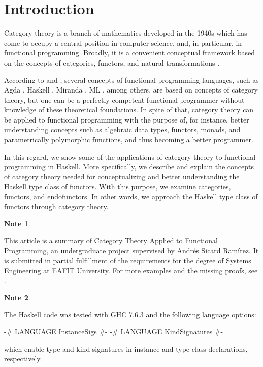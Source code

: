 \documentclass[11pt,letterpaper]{article}
\theoremstyle{definition}
\newtheorem{note}{Note}[section]
\begin{document}

\section{Introduction}
\label{sec:introduction}

Category theory is a branch of mathematics developed in the 1940s
which has come to occupy a central position in computer science, and,
in particular, in functional programming. Broadly, it is a convenient
conceptual framework based on the concepts of categories, functors,
and natural transformations
\parencites[vii]{maclane-1998}[1]{marquis-2013}.

According to \textcite[73]{elkins-2009} and
\textcite[50--51]{yorgey-2009}, several concepts of functional
programming languages, such as Agda \parencites{norell-2007}{agda},
Haskell \parencite{peytonjones-2003}, Miranda \parencite{turner-1985},
ML \parencite{milner-1984}, among others, are based on concepts of
category theory, but one can be a perfectly competent functional
programmer without knowledge of these theoretical foundations. In
spite of that, category theory can be applied to functional
programming with the purpose of, for instance, better understanding
concepts such as algebraic data types, functors, monads, and
parametrically polymorphic functions, and thus becoming a better
programmer.

In this regard, we show some of the applications of category theory to
functional programming in Haskell. More specifically, we describe and
explain the concepts of category theory needed for conceptualizing and
better understanding the Haskell type class of functors. With this
purpose, we examine categories, functors, and endofunctors. In other
words, we approach the Haskell type class of functors through category
theory.

\begin{note}
  \label{note:cain}

  This article is a summary of Category Theory Applied to Functional
  Programming, an undergraduate project supervised by Andrés Sicard
  Ramírez. It is submitted in partial fulfillment of the requirements
  for the degree of Systems Engineering at EAFIT University. For more
  examples and the missing proofs, see \parencite{villaisaza-2014}.

\end{note}

\begin{note}
  \label{note:haskell}

  The Haskell code was tested with GHC 7.6.3 and the following
  language options:
  \begin{code}
{-# LANGUAGE InstanceSigs   #-}
{-# LANGUAGE KindSignatures #-}
  \end{code}
  which enable type and kind signatures in instance and type class
  declarations, respectively.

\end{note}
\end{document}
